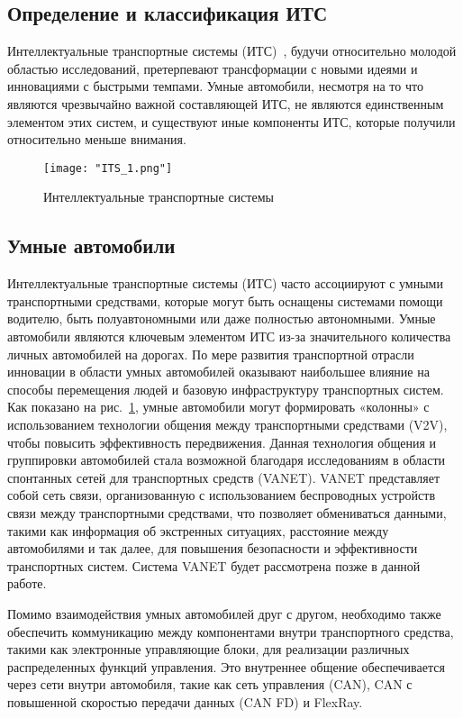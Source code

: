\subsection*{Определение и классификация ИТС}

Интеллектуальные транспортные системы (ИТС)~\cite{qureshi2013survey}, будучи относительно молодой областью исследований, претерпевают трансформации с новыми идеями и инновациями с быстрыми темпами. Умные автомобили, несмотря на то что являются чрезвычайно важной составляющей ИТС, не являются единственным элементом этих систем, и существуют иные компоненты ИТС, которые получили относительно меньше внимания.

\begin{figure}[!h]
    \centering
    \texttt{[image: "ITS\_1.png"]}
    \caption{Интеллектуальные транспортные системы}
    \label{fig:its}
\end{figure}

\subsection*{Умные автомобили}

Интеллектуальные транспортные системы (ИТС) часто ассоциируют с умными транспортными средствами, которые могут быть оснащены системами помощи водителю, быть полуавтономными или даже полностью автономными. Умные автомобили являются ключевым элементом ИТС из-за значительного количества личных автомобилей на дорогах. По мере развития транспортной отрасли инновации в области умных автомобилей оказывают наибольшее влияние на способы перемещения людей и базовую инфраструктуру транспортных систем. Как показано на рис.~\ref{fig:its}, умные автомобили могут формировать «колонны» с использованием технологии общения между транспортными средствами (V2V), чтобы повысить эффективность передвижения. Данная технология общения и группировки автомобилей стала возможной благодаря исследованиям в области спонтанных сетей для транспортных средств (VANET). VANET представляет собой сеть связи, организованную с использованием беспроводных устройств связи между транспортными средствами, что позволяет обмениваться данными, такими как информация об экстренных ситуациях, расстояние между автомобилями и так далее, для повышения безопасности и эффективности транспортных систем. Система VANET будет рассмотрена позже в данной работе.

Помимо взаимодействия умных автомобилей друг с другом, необходимо также обеспечить коммуникацию между компонентами внутри транспортного средства, такими как электронные управляющие блоки, для реализации различных распределенных функций управления. Это внутреннее общение обеспечивается через сети внутри автомобиля, такие как сеть управления (CAN), CAN с повышенной скоростью передачи данных (CAN FD) и FlexRay.

